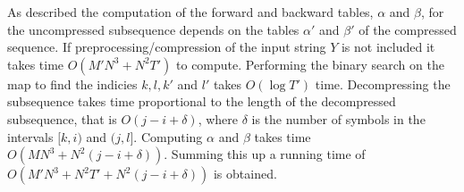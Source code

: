 As described the computation of the forward and backward tables, $\alpha$ and
$\beta$, for the uncompressed subsequence depends on the tables $\alpha'$ and
$\beta'$ of the compressed sequence. If preprocessing/compression of the input
string $Y$ is not included it takes time $O(M' N^3 + N^2 T')$ to
compute. Performing the binary search on the map to find the indicies
$k, l, k'$ and $l'$ takes $O(\log T')$ time. Decompressing the subsequence
takes time proportional to the length of the decompressed subsequence, that is
$O(j - i + \delta)$, where $\delta$ is the number of symbols in the
intervals $[k, i)$ and $(j, l]$.  Computing $\alpha$ and $\beta$ takes time
$O(M N^3 + N^2 (j - i + \delta))$.  Summing this up a running time of
$O(M' N^3 + N^2 T' + N^2 (j - i + \delta))$ is obtained.



